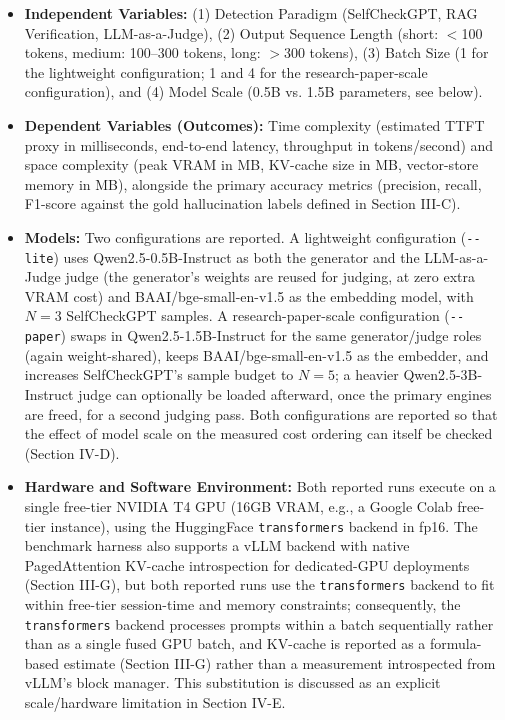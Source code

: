 \documentclass[conference]{IEEEtran}
\begin{document}
\begin{itemize}
    \item \textbf{Independent Variables:} (1) Detection Paradigm (SelfCheckGPT, RAG Verification, LLM-as-a-Judge), (2) Output Sequence Length (short: $<$100 tokens, medium: 100--300 tokens, long: $>$300 tokens), (3) Batch Size (1 for the lightweight configuration; 1 and 4 for the research-paper-scale configuration), and (4) Model Scale (0.5B vs. 1.5B parameters, see below).
    \item \textbf{Dependent Variables (Outcomes):} Time complexity (estimated TTFT proxy in milliseconds, end-to-end latency, throughput in tokens/second) and space complexity (peak VRAM in MB, KV-cache size in MB, vector-store memory in MB), alongside the primary accuracy metrics (precision, recall, F1-score against the gold hallucination labels defined in Section III-C).
    \item \textbf{Models:} Two configurations are reported. A lightweight configuration (\texttt{-{}-lite}) uses Qwen2.5-0.5B-Instruct as both the generator and the LLM-as-a-Judge judge (the generator's weights are reused for judging, at zero extra VRAM cost) and BAAI/bge-small-en-v1.5 as the embedding model, with $N=3$ SelfCheckGPT samples. A research-paper-scale configuration (\texttt{-{}-paper}) swaps in Qwen2.5-1.5B-Instruct for the same generator/judge roles (again weight-shared), keeps BAAI/bge-small-en-v1.5 as the embedder, and increases SelfCheckGPT's sample budget to $N=5$; a heavier Qwen2.5-3B-Instruct judge can optionally be loaded afterward, once the primary engines are freed, for a second judging pass. Both configurations are reported so that the effect of model scale on the measured cost ordering can itself be checked (Section IV-D).
    \item \textbf{Hardware and Software Environment:} Both reported runs execute on a single free-tier NVIDIA T4 GPU (16GB VRAM, e.g., a Google Colab free-tier instance), using the HuggingFace \texttt{transformers} backend in fp16. The benchmark harness also supports a vLLM backend with native PagedAttention KV-cache introspection for dedicated-GPU deployments (Section III-G), but both reported runs use the \texttt{transformers} backend to fit within free-tier session-time and memory constraints; consequently, the \texttt{transformers} backend processes prompts within a batch sequentially rather than as a single fused GPU batch, and KV-cache is reported as a formula-based estimate (Section III-G) rather than a measurement introspected from vLLM's block manager. This substitution is discussed as an explicit scale/hardware limitation in Section IV-E.

\end{itemize}
\end{document}
